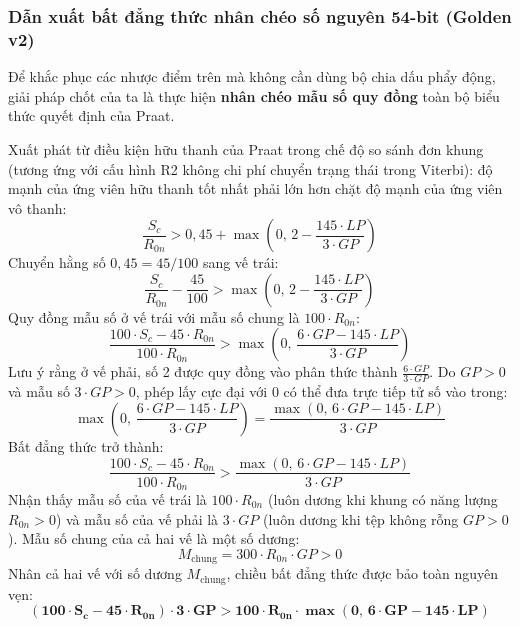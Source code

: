 \subsubsection*{Dẫn xuất bất đẳng thức nhân chéo số nguyên 54-bit (Golden v2)}
Để khắc phục các nhược điểm trên mà không cần dùng bộ chia dấu phẩy động, giải pháp chốt của ta là thực hiện \textbf{nhân chéo mẫu số quy đồng} toàn bộ biểu thức quyết định của Praat.

Xuất phát từ điều kiện hữu thanh của Praat trong chế độ so sánh đơn khung (tương ứng với cấu hình R2 không chi phí chuyển trạng thái trong Viterbi): độ mạnh của ứng viên hữu thanh tốt nhất phải lớn hơn chặt độ mạnh của ứng viên vô thanh:
\begin{equation}
    \frac{S_c}{R_{0n}} > 0{,}45 + \max\left(0,\, 2 - \frac{145 \cdot LP}{3 \cdot GP}\right)
\end{equation}
Chuyển hằng số $0{,}45 = 45 / 100$ sang vế trái:
\begin{equation}
    \frac{S_c}{R_{0n}} - \frac{45}{100} > \max\left(0,\, 2 - \frac{145 \cdot LP}{3 \cdot GP}\right)
\end{equation}
Quy đồng mẫu số ở vế trái với mẫu số chung là $100 \cdot R_{0n}$:
\begin{equation}
    \frac{100 \cdot S_c - 45 \cdot R_{0n}}{100 \cdot R_{0n}} > \max\left(0,\, \frac{6 \cdot GP - 145 \cdot LP}{3 \cdot GP}\right)
\end{equation}
Lưu ý rằng ở vế phải, số 2 được quy đồng vào phân thức thành $\frac{6 \cdot GP}{3 \cdot GP}$. Do $GP > 0$ và mẫu số $3 \cdot GP > 0$, phép lấy cực đại với 0 có thể đưa trực tiếp tử số vào trong:
\begin{equation}
    \max\left(0,\, \frac{6 \cdot GP - 145 \cdot LP}{3 \cdot GP}\right) = \frac{\max(0,\, 6 \cdot GP - 145 \cdot LP)}{3 \cdot GP}
\end{equation}
Bất đẳng thức trở thành:
\begin{equation}
    \frac{100 \cdot S_c - 45 \cdot R_{0n}}{100 \cdot R_{0n}} > \frac{\max(0,\, 6 \cdot GP - 145 \cdot LP)}{3 \cdot GP}
\end{equation}
Nhận thấy mẫu số của vế trái là $100 \cdot R_{0n}$ (luôn dương khi khung có năng lượng $R_{0n} > 0$) và mẫu số của vế phải là $3 \cdot GP$ (luôn dương khi tệp không rỗng $GP > 0$). Mẫu số chung của cả hai vế là một số dương:
\begin{equation}
    M_{\text{chung}} = 300 \cdot R_{0n} \cdot GP > 0
\end{equation}
Nhân cả hai vế với số dương $M_{\text{chung}}$, chiều bất đẳng thức được bảo toàn nguyên vẹn:
\begin{equation}
    \mathbf{(100 \cdot S_c - 45 \cdot R_{0n}) \cdot 3 \cdot GP > 100 \cdot R_{0n} \cdot \max(0,\, 6 \cdot GP - 145 \cdot LP)}
    \label{eq:ch10_cross_mult_inequality}
\end{equation}

